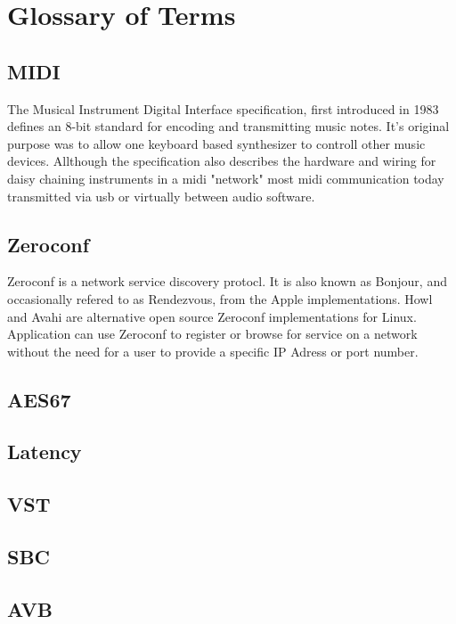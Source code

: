 \section{Glossary of Terms}

\subsection*{MIDI}
The Musical Instrument Digital Interface specification, first introduced in 1983 defines an 8-bit standard for encoding and transmitting music notes. It's original purpose was to allow one keyboard based synthesizer to controll other music devices.\cite{Boulanger:2011} Allthough the specification also describes the hardware and wiring for daisy chaining instruments in a midi "network" most midi communication today transmitted via usb or virtually between audio software.

\subsection*{Zeroconf}
Zeroconf is a network service discovery protocl. It is also known as Bonjour, and occasionally refered to as Rendezvous, from the Apple implementations. Howl and Avahi are alternative open source Zeroconf implementations for Linux. Application can use Zeroconf to register or browse for service on a network without the need for a user to provide a specific IP Adress or port number. \cite{zeroconf}

\subsection*{AES67}

\subsection*{Latency}

\subsection*{VST}
\subsection*{SBC}
\subsection*{AVB}
